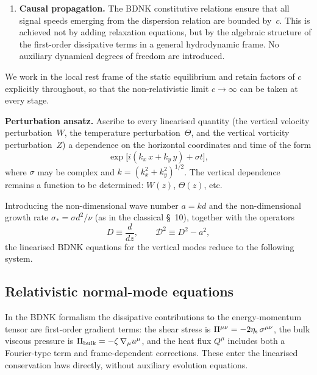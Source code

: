 \begin{enumerate}
\item \textbf{Causal propagation.}  The BDNK constitutive relations ensure
  that all signal speeds emerging from the dispersion relation are bounded
  by~$c$.  This is achieved not by adding relaxation equations, but by the
  algebraic structure of the first-order dissipative terms in a general
  hydrodynamic frame.  No auxiliary dynamical degrees of freedom are
  introduced.
\end{enumerate}

We work in the local rest frame of the static equilibrium and retain factors
of $c$ explicitly throughout, so that the non-relativistic limit $c\to\infty$
can be taken at every stage.

\medskip
\noindent\textbf{Perturbation ansatz.}
Ascribe to every linearised quantity (the vertical velocity perturbation~$W$,
the temperature perturbation~$\Theta$, and the vertical vorticity
perturbation~$Z$) a dependence on the horizontal coordinates and time of
the form
\begin{equation}
\label{eq:rel-2-88}
\exp\!\bigl[i(k_x\, x + k_y\, y) + \sigma t\bigr],
\end{equation}
where $\sigma$ may be complex and $k = (k_x^2+k_y^2)^{1/2}$.  The vertical
dependence remains a function to be determined: $W(z)$, $\Theta(z)$, etc.

Introducing the non-dimensional wave number $a = kd$ and the non-dimensional
growth rate $\sigma_* = \sigma d^2/\nu$ (as in the classical \S~10), together
with the operators
\begin{equation}
\label{eq:rel-2-91}
D \equiv \frac{d}{dz}, \qquad
\mathcal{D}^2 \equiv D^2 - a^2,
\end{equation}
the linearised BDNK equations for the vertical modes reduce to the
following system.

\subsection{Relativistic normal-mode equations}
\label{sec:rel-10b}

In the BDNK formalism the dissipative contributions to the energy-momentum
tensor are first-order gradient terms: the shear stress is
$\Pi^{\mu\nu} = -2\eta_{\mathrm{s}}\, \sigma^{\mu\nu}$, the bulk viscous pressure
is $\Pi_{\mathrm{bulk}} = -\zeta\, \nabla_\mu u^\mu$, and the heat flux
$Q^\mu$ includes both a Fourier-type term and frame-dependent corrections.
These enter the linearised conservation laws directly, without auxiliary
evolution equations.

